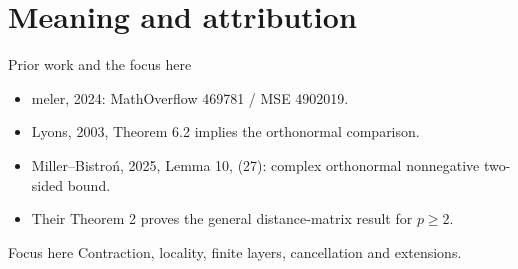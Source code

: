 \documentclass{beamer}
\begin{document}
\section{Meaning and attribution}
\begin{frame}{Prior work and the focus here}
\begin{itemize}
\item meler, 2024: MathOverflow 469781 / MSE 4902019.
\item Lyons, 2003, Theorem 6.2 implies the orthonormal comparison.
\item Miller--Bistroń, 2025, Lemma 10, (27): complex orthonormal nonnegative two-sided bound.
\item Their Theorem 2 proves the general distance-matrix result for $p\ge2$.
\end{itemize}
\begin{block}{Focus here}
Contraction, locality, finite layers, cancellation and extensions.
\end{block}
\end{frame}
\appendix
\end{document}
